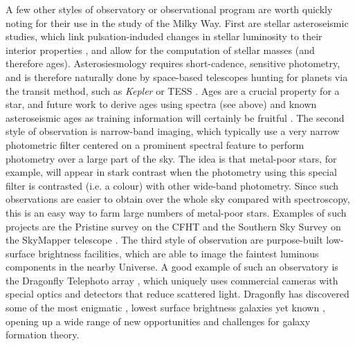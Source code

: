 A few other styles of observatory or observational program are worth quickly noting for their use in the study of the Milky Way. First are stellar asteroseismic studies, which link pulsation-induded changes in stellar luminosity to their interior properties \parencite[see][for a review]{kurtz22}, and allow for the computation of stellar masses (and therefore ages). Asterosiesmology requires short-cadence, sensitive photometry, and is therefore naturally done by space-based telescopes hunting for planets via the transit method, such as \textit{Kepler} \parencite{kepler} or TESS \parencite{tess}. Ages are a crucial property for a star, and future work to derive ages using spectra (see above) and known asteroseismic ages as training information will certainly be fruitful \parencite[e.g. see][]{montalban21}. The second style of observation is narrow-band imaging, which typically use a very narrow photometric filter centered on a prominent spectral feature to perform photometry over a large part of the sky. The idea is that metal-poor stars, for example, will appear in stark contrast when the photometry using this special filter is contrasted (i.e. a colour) with other wide-band photometry. Since such observations are easier to obtain over the whole sky compared with spectroscopy, this is an easy way to farm large numbers of metal-poor stars. Examples of such projects are the Pristine survey on the CFHT \parencite{pristine} and the Southern Sky Survey on the SkyMapper telescope \parencite{skymapperdr1}. The third style of observation are purpose-built low-surface brightness facilities, which are able to image the faintest luminous components in the nearby Universe. A good example of such an observatory is the Dragonfly Telephoto array \parencite{dragonfly}, which uniquely uses commercial cameras with special optics and detectors that reduce scattered light. Dragonfly has discovered some of the most enigmatic \parencite[i.e. both lacking, and being completely dominated by dark matter][]{vandokkum16,vandokkum18}, lowest surface brightness galaxies yet known \parencite{vandokkum15}, opening up a wide range of new opportunities and challenges for galaxy formation theory.

